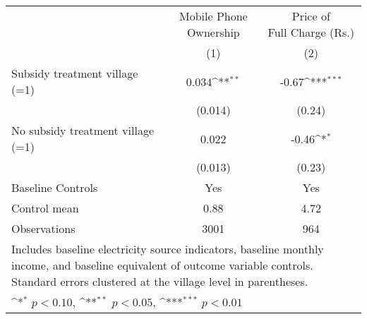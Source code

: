 \def\sym#1{\ifmmode^{#1}\else\(^{#1}\)\fi}
\begin{adjustbox}{max
width={\textwidth},caption={Endline mobile phone outcomes},nofloat=table}
\begin{tabular}{l*{2}{c}}
\toprule
& \shortstack{Mobile Phone\\Ownership} & \shortstack{Price of\\Full Charge (Rs.)}\\
& (1) & (2)\\ \hline
Subsidy treatment village (=1)&    0.034\sym{**} &    -0.67\sym{***}\\
                &  (0.014)         &   (0.24)         \\
No subsidy treatment village (=1)&    0.022         &    -0.46\sym{*}  \\
                &  (0.013)         &   (0.23)         \\
                \addlinespace
Baseline Controls &      Yes         &      Yes         \\

Control mean           &     0.88         &     4.72         \\
Observations    &     3001         &      964         \\
\bottomrule
\multicolumn{3}{p{\textwidth}}{\footnotesize Includes baseline electricity source indicators, baseline monthly income, and baseline equivalent of outcome variable controls. Standard errors clustered at the village level in parentheses.}\\
\multicolumn{3}{p{\textwidth}}{\footnotesize \sym{*} \(p<0.10\), \sym{**} \(p<0.05\), \sym{***} \(p<0.01\)}\\
\end{tabular}\end{adjustbox}

